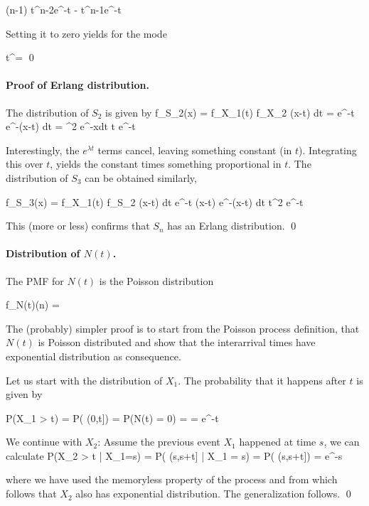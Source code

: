 \bee
{} \propto (n-1) t^{n-2}e^{-\lambda t} - \lambda t^{n-1}e^{-\lambda t}
\eee

Setting it to zero yields for the mode

\bee
t^\star =  \qed
\eee

\paragraph{Proof of Erlang distribution.} The distribution of $S_2$ is given by
\bee
f_{S_2}(x) = \int f_{X_1}(t) f_{X_2} (x-t) dt = \int \lambda e^{-\lambda t} \lambda e^{-\lambda (x-t)} dt = \lambda^2 \int e^{-\lambda x}dt \propto t e^{-\lambda t}
\eee

Interestingly, the $e^{\lambda t}$ terms cancel, leaving something constant (in $t$). Integrating this over $t$, yields the constant times something proportional in $t$. The distribution of $S_3$ can be obtained similarly,

\bee
f_{S_3}(x) = \int f_{X_1}(t) f_{S_2} (x-t) dt \propto \int \lambda e^{-\lambda t} (x-t) e^{-\lambda (x-t)} dt \propto t^2 e^{-\lambda t}
\eee

This (more or less) confirms that $S_n$ has an Erlang distribution. \qed

\paragraph{Distribution of $N(t)$.}

The PMF for $N(t)$ is the Poisson distribution

\bee
f_{N(t)}(n) = 
\eee

The (probably) simpler proof is to start from the Poisson process definition, that $N(t)$ is Poisson distributed and show that the interarrival times have exponential distribution as consequence.

Let us start with the distribution of $X_1$. The probability that it happens after $t$ is given by

\bee
P(X_1 > t) = P( (0,t]) = P(N(t) = 0) =  = e^{-\lambda t} 
\eee

We continue with $X_2$: Assume the previous event $X_1$ happened at time $s$, we can calculate 
\bee
P(X_2 > t | X_1=s) = P( (s,s+t] | X_1 = s) = P( (s,s+t]) = e^{-\lambda s}
\eee

where we have used the memoryless property of the process and from which follows that $X_2$ also has exponential distribution. The generalization follows. \qed

